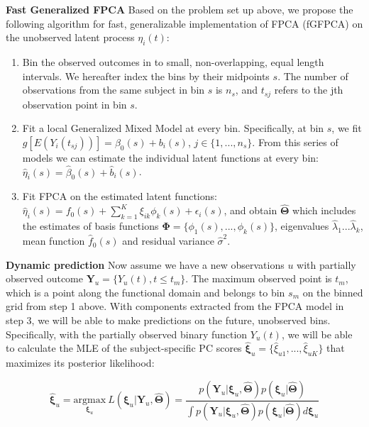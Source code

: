 \documentclass[
  11pt,
]{article}
\begin{document}
\textbf{Fast Generalized FPCA} Based on the problem set up above, we
propose the following algorithm for fast, generalizable implementation
of FPCA (fGFPCA) on the unobserved latent process \(\eta_i(t)\):

\begin{enumerate}
\def\labelenumi{\arabic{enumi}.}
\item
  Bin the observed outcomes in to small, non-overlapping, equal length
  intervals. We hereafter index the bins by their midpoints \(s\). The
  number of observations from the same subject in bin \(s\) is \(n_s\),
  and \(t_{sj}\) refers to the jth observation point in bin \(s\).
\item
  Fit a local Generalized Mixed Model at every bin. Specifically, at bin
  \(s\), we fit \(g[E(Y_i(t_{sj}))] = \beta_0(s)+b_i(s)\),
  \(j\in\{1, ..., n_s\}\). From this series of models we can estimate
  the individual latent functions at every bin:
  \(\hat{\eta}_i(s) = \hat{\beta}_0(s)+\hat{b}_i(s)\).
\item
  Fit FPCA on the estimated latent functions:
  \(\hat{\eta}_i(s) = f_0(s)+\sum_{k=1}^K\xi_{ik}\phi_{k}(s)+\epsilon_i(s)\),
  and obtain \(\hat{\boldsymbol{\Theta}}\) which includes the estimates
  of basis functions
  \(\boldsymbol{\Phi} = \{\phi_1(s), ...,\phi_k(s)\}\), eigenvalues
  \(\hat{\lambda}_1...\hat{\lambda}_k\), mean function \(\hat{f}_0(s)\)
  and residual variance \(\hat{\sigma}^2\).
\end{enumerate}

\textbf{Dynamic prediction} Now assume we have a new observations \(u\)
with partially observed outcome
\(\boldsymbol{Y}_u = \{Y_u(t), t\leq t_m\}\). The maximum observed point
is \(t_m\), which is a point along the functional domain and belongs to
bin \(s_m\) on the binned grid from step 1 above. With components
extracted from the FPCA model in step 3, we will be able to make
predictions on the future, unobserved bins. Specifically, with the
partially observed binary function \(Y_u(t)\), we will be able to
calculate the MLE of the subject-specific PC scores
\(\hat{\boldsymbol{\xi}}_u= \{\hat{\xi}_{u1},...,\hat{\xi}_{uK}\}\) that
maximizes its posterior likelihood:

\[\hat{\boldsymbol{\xi}}_u = \underset{\boldsymbol{\xi}_u}{\mathrm{argmax}} \ L(\boldsymbol{\xi}_u|\boldsymbol{Y}_u, 
\hat{\boldsymbol{\Theta}})= \frac{p(\boldsymbol{Y}_u|\boldsymbol{\xi}_u, \hat{\boldsymbol{\Theta}})p(\boldsymbol{\xi}_u|\hat{\boldsymbol{\Theta}})}{\int p(\boldsymbol{Y}_u|\boldsymbol{\xi}_u,\hat{\boldsymbol{\Theta}})p(\boldsymbol{\xi}_u|\hat{\boldsymbol{\Theta}})d\boldsymbol{\xi}_u}\]
\end{document}
